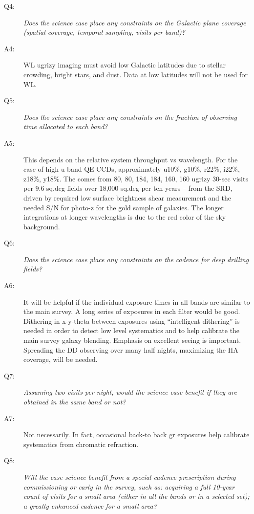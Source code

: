 \begin{description}
\item[Q4:] {\it Does the science case place any constraints on the
Galactic plane coverage (spatial coverage, temporal sampling, visits per
band)?}

\item[A4:] WL ugrizy imaging must avoid low Galactic latitudes due to
stellar crowding, bright stars, and dust. Data at low latitudes will not
be used for WL.

\item[Q5:] {\it Does the science case place any constraints on the
fraction of observing time allocated to each band?}

\item[A5:] This depends on the relative system throughput vs wavelength.
For the case of high u band QE CCDs, approximately u10\%, g10\%, r22\%,
i22\%, z18\%, y18\%. The comes from 80, 80, 184, 184, 160, 160 ugrizy
30-sec visits per 9.6 sq.deg fields over 18,000 sq.deg per ten years --
from the SRD, driven by required low surface brightness shear
measurement and the needed S/N for photo-z for the gold sample of
galaxies. The longer integrations at longer wavelengths is due to the
red color of the sky background.

\item[Q6:] {\it Does the science case place any constraints on the
cadence for deep drilling fields?}

\item[A6:] It will be helpful if the individual exposure times in all
bands are similar to the main survey. A long series of exposures in each
filter would be good. Dithering in x-y-theta between exposures using
“intelligent dithering” is needed in order to detect low level
systematics and to help calibrate the main survey galaxy blending.
Emphasis on excellent seeing is important. Spreading the DD observing
over many half nights, maximizing the HA coverage, will be needed.

\item[Q7:] {\it Assuming two visits per night, would the science case
benefit if they are obtained in the same band or not?}

\item[A7:] Not necessarily. In fact, occasional back-to back gr
exposures help calibrate systematics from chromatic refraction.

\item[Q8:] {\it Will the case science benefit from a special cadence
prescription during commissioning or early in the survey, such as:
acquiring a full 10-year count of visits for a small area (either in all
the bands or in a  selected set); a greatly enhanced cadence for a small
area?}


\end{description}
